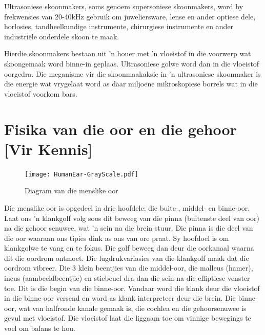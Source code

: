 Ultrasoniese skoonmakers, soms genoem supersoniese skoonmakers, word by frekwensies van 20-40kHz gebruik om juweliersware, lense en ander optiese dele, horlosies, tandheelkundige instrumente, chirurgiese instrumente en ander industri\"ele onderdele skoon te maak.

Hierdie skoonmakers bestaan uit 'n houer met 'n vloeistof in die voorwerp wat skoongemaak word binne-in geplaas. Ultrasoniese golwe word dan in die vloeistof oorgedra. Die meganisme vir die skoonmaakaksie in 'n ultrasoniese skoonmaker is die energie wat vrygelaat word as daar miljoene mikroskopiese borrels wat in die vloeistof voorkom bars.\par
\label{m38800*notfhsst!!!underscore!!!id482}



\section*{Fisika van die oor en die gehoor [Vir Kennis]}
            \nopagebreak
\begin{figure}[H]
\begin{center}
\texttt{[image: HumanEar-GrayScale.pdf]}
\end{center}
\caption{Diagram van die menslike oor }
\label{Human Ear}
\end{figure}


Die menslike oor is opgedeel in drie hoofdele: die buite-, middel- en binne-oor. Laat ons 'n klankgolf volg soos dit beweeg van die pinna (buitenste deel van oor) na die gehoor senuwee, wat 'n sein na die brein stuur. Die pinna is die deel van die oor waaraan ons tipies dink as ons van ore praat. Sy hoofdoel is om klankgolwe te vang en te fokus. Die golf beweeg dan deur die oorkanaal waarna dit die oordrom ontmoet. Die lugdrukvariasies van die klankgolf maak dat die oordrom vibreer. Die 3 klein beentjies van die middel-oor, die malleus (hamer), incus (aambeeldbeentjie) en stiebeuel dra dan die sein na die elliptiese venster toe. Dit is die begin van die binne-oor. Vandaar word die klank deur die vloeistof in die binne-oor versend en word as klank interpreteer deur die brein. Die binne-oor, wat van halfronde kanale gemaak is, die cochlea en die gehoorsenuwee is gevul met vloeistof. Die vloeistof laat die liggaam toe om vinnige bewegings te voel om balans te hou.
\par

